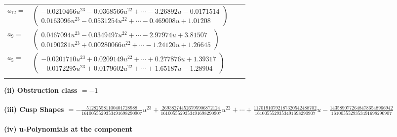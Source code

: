 \documentclass[1p]{elsarticle_modified}
\theoremstyle{definition}
\begin{document}
\begin{tabular}{m{7pt} m{180pt} m{7pt} m{180pt} }
\flushright $a_{12}=$&$\begin{pmatrix}-0.0210466 u^{23}-0.0368566 u^{22}+\cdots-3.26892 u-0.0171514\\0.0163096 u^{23}-0.0531254 u^{22}+\cdots-0.469008 u+1.01208\end{pmatrix}$ \\
\flushright $a_{9}=$&$\begin{pmatrix}0.0467094 u^{23}-0.0349497 u^{22}+\cdots-2.97974 u+3.81507\\0.0190281 u^{23}+0.00280066 u^{22}+\cdots-1.24120 u+1.26645\end{pmatrix}$ \\
\flushright $a_{5}=$&$\begin{pmatrix}-0.0201710 u^{23}+0.0209149 u^{22}+\cdots+0.277876 u+1.39317\\-0.0172295 u^{23}+0.0179602 u^{22}+\cdots+1.65187 u-1.28904\end{pmatrix}$\\&\end{tabular}
\flushleft \textbf{(ii) Obstruction class $= -1$}\\~\\
\flushleft \textbf{(iii) Cusp Shapes $= -\frac{512825581100401728988}{1610055529353491698290907} u^{23}+\frac{269382744526795906872124}{1610055529353491698290907} u^{22}+\cdots+\frac{11701910792187320542488702}{1610055529353491698290907} u-\frac{14358907726484786548966942}{1610055529353491698290907}$}\\~\\
\newpage\renewcommand{\arraystretch}{1}
\flushleft \textbf{(iv) u-Polynomials at the component}\newline \\
\end{document}
